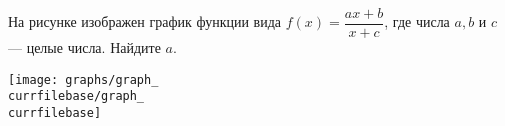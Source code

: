\begin{ex}
	\begin{condition}
		\begin{minipage}[t]{0.67\textwidth}
			На рисунке изображен график функции вида \( f(x)=\dfrac{ax+b}{x+c} \), где числа \( a, b \) и \( c \) --- целые числа. Найдите \( a \).
		\end{minipage}
		\begin{minipage}[c]{0.25\textwidth}
			\texttt{[image: graphs/graph\_\\currfilebase/graph\_\\currfilebase]}
		\end{minipage}
	\end{condition}
\end{ex}